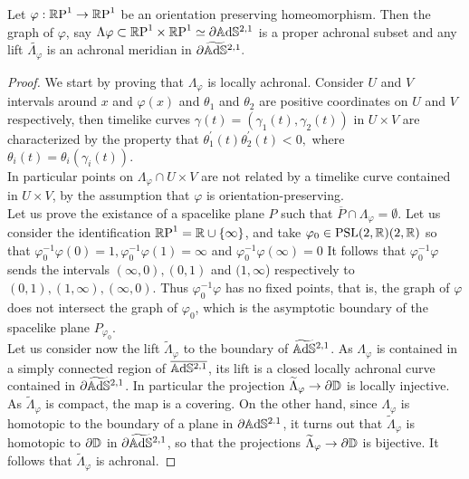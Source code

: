 \begin{lemma}
    Let $\varphi:\mathbb{R}\text{P}^1\to\mathbb{R}\text{P}^1$ be an orientation preserving homeomorphism. Then the graph of $\varphi$, say $\Lambda\varphi\subset \mathbb{R}\text{P}^1\times\mathbb{R}\text{P}^1\simeq\partial\mathbb{A}\mathrm{d}\mathbb{S}^{2,1}$ is a proper achronal subset and any lift $\tilde{\Lambda_\varphi}$ is an achronal meridian in $\partial\widetilde{\mathbb{A}\mathrm{d}\mathbb{S}}{}^{2,1}.$  
\end{lemma}
\begin{proof}
    We start by proving that $\Lambda_\varphi$ is locally achronal. Consider $U$ and $V$ intervals around $x$ and $\varphi(x)$ and $\theta_1$ and $\theta_2$ are positive coordinates on $U$ and $V$ respectively, then timelike curves $\gamma(t)=(\gamma_1(t),\gamma_2(t))$ in $U\times V$ are characterized by the property that $\theta_1^{\prime} (t)\theta_2^{\prime} (t)<0,$ where $\theta_i(t)=\theta_i(\gamma_i(t)).$ \\
    In particular points on $\Lambda_\varphi\cap U\times V$ are not related by a timelike curve contained in $U\times V$, by the assumption that $\varphi$ is orientation-preserving. \\
    Let us prove the existance of a spacelike plane $P$ such that $\overline{P}\cap \Lambda_\varphi=\emptyset.$ Let us consider the identification $\mathbb{R}\text{P}^1=\mathbb{R}\cup\{\infty\}$, and take $\varphi_0\in\text{PSL}(2,\mathbb{R})(2,\mathbb{R})$ so that $\varphi_0^{-1}\varphi(0)=1, \varphi_0^{-1}\varphi(1)=\infty$ and $\varphi_0^{-1}\varphi(\infty)=0$ It follows that $\varphi_0^{-1}\varphi$ sends the intervals $(\infty,0), (0,1)$ and $(1,\infty$) respectively to $(0,1),(1,\infty),(\infty,0)$. Thus $\varphi_0^{-1}\varphi$ has no fixed points, that is, the graph of $\varphi$ does not intersect the graph of $\varphi_0$, which is the asymptotic boundary of the spacelike plane $P_{\varphi_0}.$\\
    Let us consider now the lift $\widetilde{\Lambda}_\varphi$ to the boundary of $\widetilde{\mathbb{A}\mathrm{d}\mathbb{S}}{}^{2,1}$. As $\Lambda_\varphi$ is contained in a simply connected region of $\overline{\mathbb{A}\mathrm{d}\mathbb{S}^{2,1}}$, its lift is a closed locally achronal curve contained in $\partial\widetilde{\mathbb{A}\mathrm{d}\mathbb{S}}{}^{2,1}$. In particular the projection $\widetilde{\Lambda}_\varphi\to\partial\mathbb{D}$ is locally injective. As $\widetilde{\Lambda}_\varphi$ is compact, the map is a covering. On the other hand, since $\Lambda_\varphi$ is homotopic to the boundary of a plane in $\partial\mathbb{A}\mathrm{d}\mathbb{S}^{2.1}$, it turns out that $\widetilde{\Lambda}_\varphi$ is homotopic to $\partial\mathbb{D}$ in $\partial\widetilde{\mathbb{A}\mathrm{d}\mathbb{S}}{}^{2,1}$, so that the projections $\widetilde{\Lambda}_\varphi\to\partial\mathbb{D}$ is bijective. It follows that $\widetilde{\Lambda}_\varphi$ is achronal.  
\end{proof}

